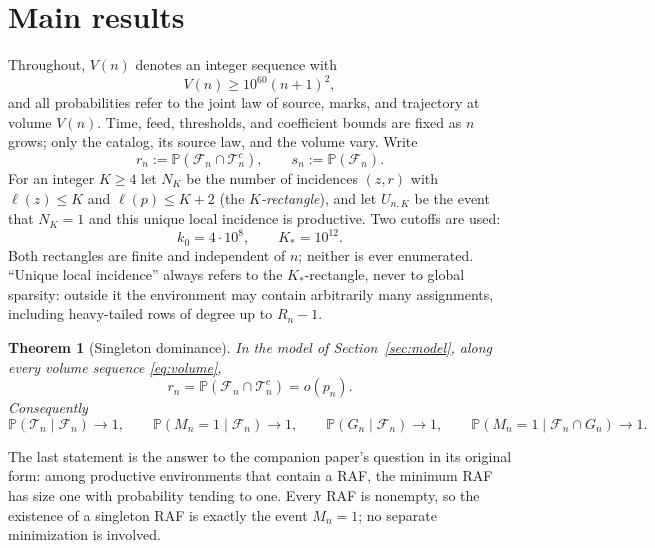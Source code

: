 \documentclass[11pt,letterpaper]{article}
\theoremstyle{plain}
\newtheorem{theorem}{Theorem}[section]
\theoremstyle{definition}
\theoremstyle{remark}
\numberwithin{equation}{section}
\newcommand{\PP}{\mathbb P}
\newcommand{\cF}{\mathcal F}
\newcommand{\cT}{\mathcal T}
\begin{document}
\section{Main results}\label{sec:results}

Throughout, $V(n)$ denotes an integer sequence with
\begin{equation}\label{eq:volume}
 V(n)\ge10^{60}(n+1)^2,
\end{equation}
and all probabilities refer to the joint law of source, marks, and trajectory at volume $V(n)$. Time, feed, thresholds, and coefficient bounds are fixed as $n$ grows; only the catalog, its source law, and the volume vary. Write
\[
 r_n:=\PP(\cF_n\cap\cT_n^c),\qquad s_n:=\PP(\cF_n) .
\]
For an integer $K\ge4$ let $N_K$ be the number of incidences $(z,r)$ with $\ell(z)\le K$ and $\ell(p)\le K+2$ (the \emph{$K$-rectangle}), and let $U_{n,K}$ be the event that $N_K=1$ and this unique local incidence is productive. Two cutoffs are used:
\begin{equation}\label{eq:cutoffs}
 k_0=4\cdot10^8,\qquad K_*=10^{12} .
\end{equation}
Both rectangles are finite and independent of $n$; neither is ever enumerated. ``Unique local incidence'' always refers to the $K_*$-rectangle, never to global sparsity: outside it the environment may contain arbitrarily many assignments, including heavy-tailed rows of degree up to $R_n-1$.

\begin{theorem}[Singleton dominance]\label{thm:main}
In the model of Section~\ref{sec:model}, along every volume sequence \eqref{eq:volume},
\begin{equation}\label{eq:core}
 r_n=\PP(\cF_n\cap\cT_n^c)=o(p_n) .
\end{equation}
Consequently
\begin{equation}\label{eq:posteriors}
 \PP(\cT_n\mid\cF_n)\to1,\qquad
 \PP(M_n=1\mid\cF_n)\to1,\qquad
 \PP(G_n\mid\cF_n)\to1,\qquad
 \PP(M_n=1\mid\cF_n\cap G_n)\to1 .
\end{equation}
\end{theorem}
The last statement is the answer to the companion paper's question in its original form: among productive environments that contain a RAF, the minimum RAF has size one with probability tending to one. Every RAF is nonempty, so the existence of a singleton RAF is exactly the event $M_n=1$; no separate minimization is involved.
\end{document}
